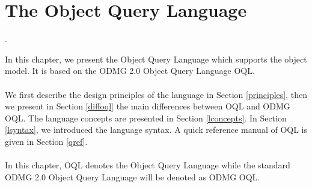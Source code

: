 

\newcommand{\mantitle}{\textsc{Object Query Language}}


\tableofcontents

\chapter{The Object Query Language}
\newcommand{\ex}{\emph{expr} }
\newcommand{\oqlsect}[1]{Section \ref{#1}}
\newcommand{\bin}[1]{\ex\texttt{#1} \ex}
\newcommand{\ass}[1]{\emph{lvalue} \texttt{#1} \ex}
\newcommand{\una}[1]{\texttt{#1} \ex}
\newcommand{\unar}[1]{\ex \texttt{#1}}
\newcommand{\ide}{\emph{identifier} }
\newcommand{\unide}[1]{\texttt{#1} \emph{identifier}}

\newcommand{\xtab}{longtable}
\newcommand{\btab}{\\\begin{longtable}}
\newcommand{\etab}{\end{longtable}}
\newcommand{\dimtab}{|p{3cm}|p{4cm}|}
\newcommand{\dimtabx}{|p{3cm}|p{5cm}|}

\newcommand{\rerr}{\emph{raises an error}}
\newcommand{\Cidem}{expression syntax, semantics, associativity
and precedence are quite identical to the corresponding C and C++ expressions}.
\newcommand{\geninfo}{\hline \multicolumn{2}{|c|}{\emph{General Information}}}
\newcommand{\expex}[1]{\hline \multicolumn{#1}{|c|}{\emph{Expression Examples}}}
\newcommand{\poscomb}[1]{\hline \multicolumn{#1}{|c|}{\emph{Possible Operand Combinations}}}
\newcommand{\bettabx}{\mbox{ }\\\\\mbox{ }\\}
\newcommand{\bettab}{\mbox{}}

In this chapter, we present the \eyedb Object Query Language which supports
the \eyedb object model. It is based on the ODMG 2.0 Object Query Language
OQL.
\\
\\
We first describe the design principles of the language in
\oqlsect{principles}, then
we present in \oqlsect{diffoql} the main differences between \eyedb
OQL and ODMG OQL.
The language concepts are presented in \oqlsect{lconcepts}.
In \oqlsect{lsyntax}, we introduced the language syntax.
A quick reference manual of OQL is given in \oqlsect{qref}.
\\
\\
In this chapter, OQL denotes the \eyedb Object Query Language while
the standard ODMG 2.0 Object Query Language will be denoted as ODMG OQL.


